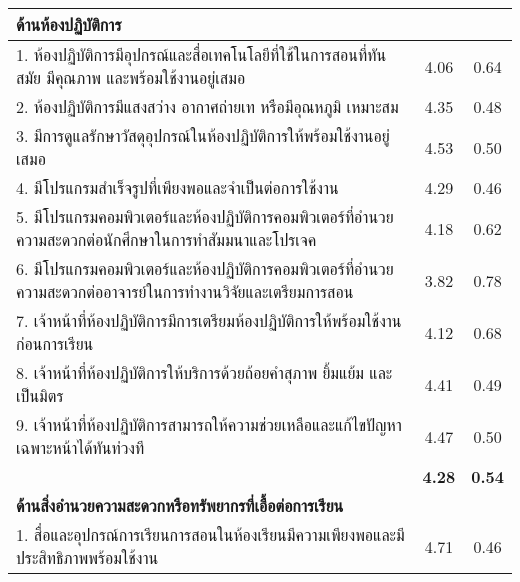 \begin{center}
\begin{longtable}{|>{\raggedright}p{9cm}|c|c|}
			\textbf{ด้านห้องปฏิบัติการ}                                                                                          &               &               \\ \hline
			1.   ห้องปฏิบัติการมีอุปกรณ์และสื่อเทคโนโลยีที่ใช้ในการสอนที่ทันสมัย  มีคุณภาพ    และพร้อมใช้งานอยู่เสมอ             & 4.06          & 0.64          \\ \hline
			2.   ห้องปฏิบัติการมีแสงสว่าง    อากาศถ่ายเท  หรือมีอุณหภูมิ  เหมาะสม                                                & 4.35          & 0.48          \\ \hline
			3.   มีการดูแลรักษาวัสดุอุปกรณ์ในห้องปฏิบัติการให้พร้อมใช้งานอยู่เสมอ                                                & 4.53          & 0.50          \\ \hline
			4.   มีโปรแกรมสำเร็จรูปที่เพียงพอและจำเป็นต่อการใช้งาน                                                               & 4.29          & 0.46          \\ \hline
			5.   มีโปรแกรมคอมพิวเตอร์และห้องปฏิบัติการคอมพิวเตอร์ที่อำนวยความสะดวกต่อนักศึกษาในการทำสัมมนาและโปรเจค              & 4.18          & 0.62          \\ \hline
			6.   มีโปรแกรมคอมพิวเตอร์และห้องปฏิบัติการคอมพิวเตอร์ที่อำนวยความสะดวกต่ออาจารย์ในการทำงานวิจัยและเตรียมการสอน       & 3.82          & 0.78          \\ \hline
			7.   เจ้าหน้าที่ห้องปฏิบัติการมีการเตรียมห้องปฏิบัติการให้พร้อมใช้งานก่อนการเรียน                                    & 4.12          & 0.68          \\ \hline
			8.   เจ้าหน้าที่ห้องปฏิบัติการให้บริการด้วยถ้อยคำสุภาพ ยิ้มแย้ม และเป็นมิตร                                          & 4.41          & 0.49          \\ \hline
			9.   เจ้าหน้าที่ห้องปฏิบัติการสามารถให้ความช่วยเหลือและแก้ไขปัญหาเฉพาะหน้าได้ทันท่วงที                               & 4.47          & 0.50          \\ \hline
			\multicolumn{1}{|r|}{\textbf{เฉลี่ยด้านห้องปฏิบัติการ}}                                                              & \textbf{4.28} & \textbf{0.54} \\ \hline
			\textbf{ด้านสิ่งอำนวยความสะดวกหรือทรัพยากรที่เอื้อต่อการเรียน}                                                       &               &               \\ \hline
			1.   สื่อและอุปกรณ์การเรียนการสอนในห้องเรียนมีความเพียงพอและมีประสิทธิภาพพร้อมใช้งาน                                 & 4.71          & 0.46          \\ \hline

\end{longtable}
\end{center}
